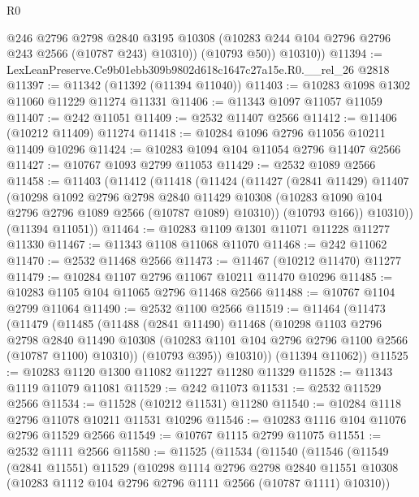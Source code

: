 \begin{lexlean}{R0}
\begin{coremodule}
            @246
            @2796
            @2798
            @2840
            @3195
            @10308
            (@10283 @244 @104 @2796 @2796 @243 @2566 (@10787 @243) @10310))
          (@10793 @50))
        @10310))
@11394 := LexLeanPreserve.Ce9b01ebb309b9802d618c1647c27a15e.R0.__rel_26 @2818
@11397 := @11342 (@11392 (@11394 @11040))
@11403 := @10283 @1098 @1302 @11060 @11229 @11274 @11331
@11406 := @11343 @1097 @11057 @11059
@11407 := @242 @11051
@11409 := @2532 @11407 @2566
@11412 := @11406 (@10212 @11409) @11274
@11418 := @10284 @1096 @2796 @11056 @10211 @11409 @10296
@11424 := @10283 @1094 @104 @11054 @2796 @11407 @2566
@11427 := @10767 @1093 @2799 @11053
@11429 := @2532 @1089 @2566
@11458 := @11403
    (@11412
      (@11418
        (@11424
          (@11427
            (@2841 @11429)
            @11407
            (@10298
              @1092
              @2796
              @2798
              @2840
              @11429
              @10308
              (@10283 @1090 @104 @2796 @2796 @1089 @2566 (@10787 @1089) @10310))
            (@10793 @166))
          @10310))
      (@11394 @11051))
@11464 := @10283 @1109 @1301 @11071 @11228 @11277 @11330
@11467 := @11343 @1108 @11068 @11070
@11468 := @242 @11062
@11470 := @2532 @11468 @2566
@11473 := @11467 (@10212 @11470) @11277
@11479 := @10284 @1107 @2796 @11067 @10211 @11470 @10296
@11485 := @10283 @1105 @104 @11065 @2796 @11468 @2566
@11488 := @10767 @1104 @2799 @11064
@11490 := @2532 @1100 @2566
@11519 := @11464
    (@11473
      (@11479
        (@11485
          (@11488
            (@2841 @11490)
            @11468
            (@10298
              @1103
              @2796
              @2798
              @2840
              @11490
              @10308
              (@10283 @1101 @104 @2796 @2796 @1100 @2566 (@10787 @1100) @10310))
            (@10793 @395))
          @10310))
      (@11394 @11062))
@11525 := @10283 @1120 @1300 @11082 @11227 @11280 @11329
@11528 := @11343 @1119 @11079 @11081
@11529 := @242 @11073
@11531 := @2532 @11529 @2566
@11534 := @11528 (@10212 @11531) @11280
@11540 := @10284 @1118 @2796 @11078 @10211 @11531 @10296
@11546 := @10283 @1116 @104 @11076 @2796 @11529 @2566
@11549 := @10767 @1115 @2799 @11075
@11551 := @2532 @1111 @2566
@11580 := @11525
    (@11534
      (@11540
        (@11546
          (@11549
            (@2841 @11551)
            @11529
            (@10298
              @1114
              @2796
              @2798
              @2840
              @11551
              @10308
              (@10283 @1112 @104 @2796 @2796 @1111 @2566 (@10787 @1111) @10310))

\end{coremodule}
\end{lexlean}
